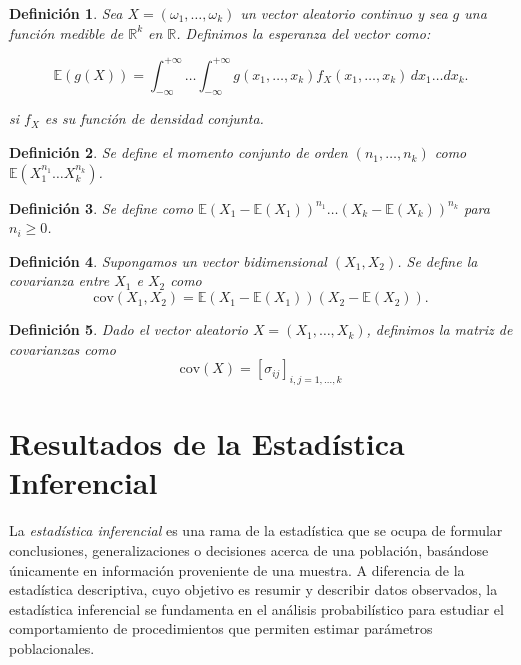 \documentclass{report}
\newtheorem{dfn}{Definición}[section]
\begin{document}
\begin{dfn}\label{dfn:expected_value_vector_cont}
Sea $X = (\omega_1, \dots, \omega_k)$ un vector aleatorio continuo y sea $g$ una función medible de $\mathbb{R}^k$ en $\mathbb{R}$. 
Definimos la esperanza del vector como:

\[
\mathbb{E}(g(X)) = \int_{-\infty}^{+\infty} \dots \int_{-\infty}^{+\infty} g(x_1,\dots,x_k)f_X(x_1,\dots,x_k) \,dx_1 \dots dx_k.
\]

si $f_X$ es su función de densidad conjunta.
\end{dfn}

\begin{dfn} \label{dfn:momento_conjunto}  Se define el momento conjunto de orden $(n_1,\dots,n_k)$ como $\mathbb{E}(X_1^{n_1} \dots X_k^{n_k})$.
\end{dfn}


\begin{dfn} \label{dfn:momento_conjunto_central}  Se define como $\mathbb{E}(X_1 - \mathbb{E}(X_1))^{n_1} \dots (X_k - \mathbb{E}(X_k))^{n_k}$ para $n_i \geq 0$.
\end{dfn}


\begin{dfn} \label{dfn:covarianza} Supongamos un vector bidimensional $(X_1,X_2)$. Se define la covarianza entre $X_1$ e $X_2$ como
\[
\mathrm{cov}(X_1, X_2) = \mathbb{E}(X_1 - \mathbb{E}(X_1))(X_2 - \mathbb{E}(X_2)).
\]
\end{dfn}

\begin{dfn} \label{dfn:matriz_covarianzas} Dado el vector aleatorio $X = (X_1,\dots,X_k)$, definimos la matriz de covarianzas como
\[
\mathrm{cov}(X) = [\sigma_{ij}]_{i,j=1,\dots,k}
\]
\end{dfn}

\section{Resultados de la Estadística Inferencial}


La \emph{estadística inferencial} es una rama de la estadística que se ocupa de formular conclusiones, generalizaciones o decisiones acerca de una población, basándose únicamente 
en información proveniente de una muestra. A diferencia de la estadística descriptiva, cuyo objetivo es resumir y describir datos observados, la estadística inferencial se 
fundamenta en el análisis probabilístico para estudiar el comportamiento de procedimientos que permiten estimar parámetros poblacionales.
\end{document}

